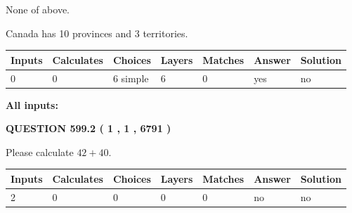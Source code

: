 \documentclass[12pt]{article}
\begin{document}
 
 None of above.
 
 
\noindent{}
 
 
Canada has 10  provinces and 3 territories.
 
 
\noindent{}
 
 
   
   
   
   
\noindent\begin{tabular}{|l|l|l|l|l|l|l|}
 \hline
Inputs & Calculates & Choices & Layers & Matches & Answer & Solution \\ \hline
 0  & 
 0  & 
 6
  simple  
  & 
 6  & 
 0  & 
  yes & 
  no 
  \\ \hline
 \end{tabular}
   
   
   
   
\noindent{}
   
   
   
   
\noindent\vspace{0.1in}\hspace{-0.08in} {\textbf{\Large{All inputs: }}}
   
   
  
\vspace{0.2in}
  
{\textbf{\Large{QUESTION
599.2 
 ( 1 , 1 , 6791 )
}}}
  
  
 
Please calculate $ %
42 +  %
40 $.
 
 
   
   
   
   
\noindent\begin{tabular}{|l|l|l|l|l|l|l|}
 \hline
Inputs & Calculates & Choices & Layers & Matches & Answer & Solution \\ \hline
 2  & 
 0  & 
 0
  & 
 0  & 
 0  & 
  no & 
  no 
  \\ \hline
 \end{tabular}
   
   
   
   
\noindent{}
   
\end{document}

